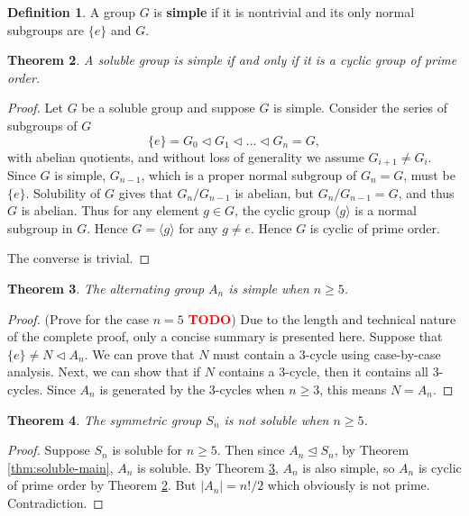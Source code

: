 \documentclass[12pt]{article}
\newtheorem{theorem}{Theorem}
\theoremstyle{definition}
\newtheorem{definition}[theorem]{Definition}
\newcommand{\TODO}{\textbf{\textcolor{red}{TODO}}}
\begin{document}
\begin{definition}
    A group $G$ is \textbf{simple} if it is nontrivial and its only normal subgroups are $\{ e \}$ and $G$. 
\end{definition}

\begin{theorem} \label{thm:soluble-and-simple}
    A soluble group is simple if and only if it is a cyclic group of prime order.
\end{theorem}

\begin{proof}
    Let $G$ be a soluble group and suppose $G$ is simple. Consider the series of subgroups of $G$
$$
\{ e \}=G_0 \triangleleft G_1 \triangleleft \ldots \triangleleft G_n=G,
$$
with abelian quotients, and without loss of generality we assume $G_{i+1} \neq G_i$. Since $G$ is simple, $G_{n-1}$, which is a proper normal subgroup of $G_n = G$, must be $\{ e \}$. Solubility of $G$ gives that $G_n / G_{n -1 }$ is abelian, but $G_n / G_{n - 1} = G$, and thus $G$ is abelian. Thus for any element $g \in G$, the cyclic group $\langle g\rangle$ is a normal subgroup in $G$. Hence  $G = \langle g\rangle$ for any $g \neq e$. Hence $G$ is cyclic of prime order.

The converse is trivial.
\end{proof}


\begin{theorem} \label{thm:simple-alternating}
    The alternating group $A_n$ is simple when $n \ge 5$. 
\end{theorem}

\begin{proof}
    (Prove for the case $n=5$ \TODO) Due to the length and technical nature of the complete proof, only a concise summary is presented here. 
    Suppose that $\{ e \} \neq N \triangleleft A_n$. We can prove that $N$ must contain a $3$-cycle using case-by-case analysis. Next, we can show that if $N$ contains a $3$-cycle, then it contains all $3$-cycles. Since $A_n$ is generated by the $3$-cycles when $n \ge 3$, this means $N = A_n$.
\end{proof}

\begin{theorem} \label{thm:symmetric-not-soluble}
    The symmetric group $S_n$ is not soluble when $n \ge 5$. 
\end{theorem}

\begin{proof}
    Suppose $S_n$ is soluble for $n \ge 5$. Then since $A_n \trianglelefteq S_n$, by Theorem \ref{thm:soluble-main}, $A_n$ is soluble. By Theorem \ref{thm:simple-alternating}, $A_n$ is also simple, so $A_n$ is cyclic of prime order by Theorem \ref{thm:soluble-and-simple}. But $|A_n| = n! / 2$ which obviously is not prime. Contradiction.
\end{proof}
\end{document}

